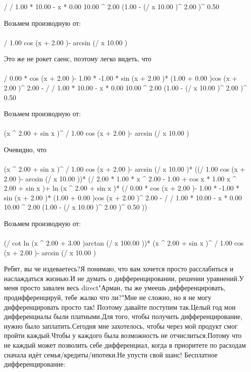 \begin{}
/ {/ {1.00 * 10.00 - x * 0.00 }{10.00 ^ {2.00 }}}{(1.00 - (/ {x }{10.00 })^ {2.00 })^ {0.50 }}\\
\end{}
Возьмем производную от:
\begin{gather}
\end{gather}
\begin{}
/ {1.00 }{cos (x + 2.00 )}- arcsin (/ {x }{10.00 })\\
\end{}
Это же не рокет саенс, поэтому легко видеть, что
\begin{gather}
\end{gather}
\begin{}
/ {0.00 * cos (x + 2.00 )- 1.00 * -1.00 * sin (x + 2.00 )* (1.00 + 0.00 )}{cos (x + 2.00 )^ {2.00 }}- / {/ {1.00 * 10.00 - x * 0.00 }{10.00 ^ {2.00 }}}{(1.00 - (/ {x }{10.00 })^ {2.00 })^ {0.50 }}\\
\end{}
Возьмем производную от:
\begin{gather}
\end{gather}
\begin{}
(x ^ {2.00 }+ sin x )^ {/ {1.00 }{cos (x + 2.00 )}- arcsin (/ {x }{10.00 })}\\
\end{}
Очевидно, что
\begin{gather}
\end{gather}
\begin{}
(x ^ {2.00 }+ sin x )^ {/ {1.00 }{cos (x + 2.00 )}- arcsin (/ {x }{10.00 })}* ((/ {1.00 }{cos (x + 2.00 )}- arcsin (/ {x }{10.00 }))* (/ {2.00 * 1.00 * x ^ {2.00 - 1.00 }+ cos x * 1.00 }{x ^ {2.00 }+ sin x })+ ln (x ^ {2.00 }+ sin x )* (/ {0.00 * cos (x + 2.00 )- 1.00 * -1.00 * sin (x + 2.00 )* (1.00 + 0.00 )}{cos (x + 2.00 )^ {2.00 }}- / {/ {1.00 * 10.00 - x * 0.00 }{10.00 ^ {2.00 }}}{(1.00 - (/ {x }{10.00 })^ {2.00 })^ {0.50 }}))\\
\end{}
Возьмем производную от:
\begin{gather}
\end{gather}
\begin{}
(/ {cot ln (x ^ {2.00 }+ 3.00 )}{arctan (/ {x }{100.00 })})* (x ^ {2.00 }+ sin x )^ {/ {1.00 }{cos (x + 2.00 )}- arcsin (/ {x }{10.00 })}\\
\end{}
Ребят, вы че издеваетесь?Я понимаю, что вам хочется просто расслабиться и наслаждаться жизнью.И не думать о дифференцировании, решении уравнений.У меня просто завален весь direct"Арман, ты же умеешь дифференцировать, продифференцируй, тебе жалко что ли?"Мне не сложно, но я не могу дифференцировать просто так! Поэтому давайте поступим так.Целый год мои дифференциалы были платными.Для того, чтобы получить дифференцирование, нужно было заплатить.Сегодня мне захотелось, чтобы через мой продукт смог пройти каждый.Чтобы у каждого была возможность не отчислиться.Потому что не каждый может позволить себе дифференциал, когда в приоритете по расходам сначала идёт семья/кредиты/ипотеки.Не упусти свой шанс! Бесплатное дифференцирование: 
